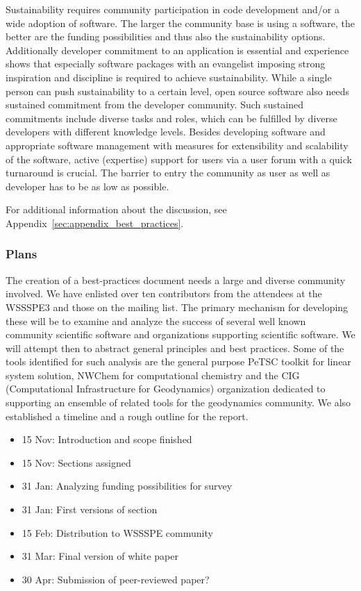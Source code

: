 Sustainability requires community participation in code development and/or a wide adoption of software. The larger the community base is using a software, the better are the funding possibilities and thus also the sustainability options. Additionally developer commitment to an application is essential and experience shows that especially software packages with an evangelist imposing strong inspiration and discipline is required to achieve sustainability.
While a single person can push sustainability to a certain level, open source software also needs sustained commitment from the developer community. Such sustained commitments include diverse tasks and roles, which can be fulfilled by diverse developers with different knowledge levels. Besides developing software and appropriate software management with measures for extensibility and scalability of the software, active (expertise) support for users via a user forum with a quick turnaround is crucial. The barrier to entry the community as user as well as developer has to be as low as possible.

For additional information about the discussion, see Appendix~\ref{sec:appendix_best_practices}.

\subsubsection{Plans}
The creation of a best-practices document needs a large and diverse community involved. We have enlisted over ten contributors from the attendees at the WSSSPE3 and 
those on the mailing list. The primary mechanism for developing these will be to examine and analyze the success of several well known community scientific
software and organizations supporting scientific software. We will attempt then to abstract general principles and best practices. Some of the tools identified for such analysis are
the general purpose PeTSC toolkit for linear system solution, NWChem for computational chemistry and the CIG (Computational Infrastructure for Geodynamics) organization dedicated to supporting an ensemble of related tools for the geodynamics community. 
We also established a timeline and a rough outline for the report.

\begin{itemize}
%
\item 15 Nov: Introduction and scope finished
\item 15 Nov: Sections assigned
\item 31 Jan: Analyzing funding possibilities for survey
\item 31 Jan: First versions of section
\item 15 Feb: Distribution to WSSSPE community
\item 31 Mar: Final version of white paper
\item 30 Apr: Submission of peer-reviewed paper?
\end{itemize}


